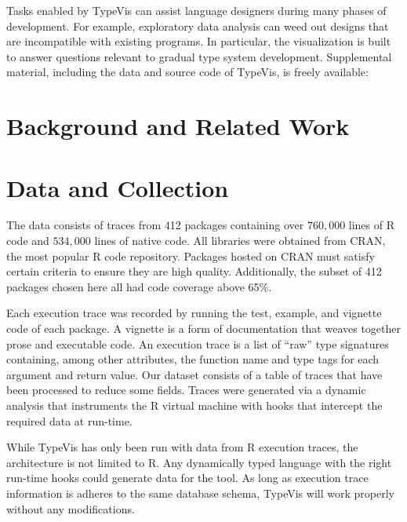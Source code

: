 \documentclass{vgtc}                          %
\begin{document}
Tasks enabled by {\sc TypeVis} can assist language designers
during many phases of development.
For example, exploratory data analysis can weed out designs that
are incompatible with existing programs.
In particular, the visualization is built to answer questions
relevant to gradual type system development.
Supplemental material, including the data and source code of
{\sc TypeVis}, is freely available: 


\section{Background and Related Work}






\section{Data and Collection}


The data consists of traces from 412 packages
containing over $760,000$ lines of R code
and $534,000$ lines of native code.
All libraries were obtained from CRAN,
the most popular R code repository.
Packages hosted on CRAN must satisfy certain criteria
to ensure they are high quality.
Additionally, the subset of 412 packages chosen here
all had code coverage above 65\%.

Each execution trace was recorded by running
the test, example, and vignette code of each package.
A vignette is a form of documentation that weaves
together prose and executable code.
An execution trace is a list of ``raw'' type signatures
containing, among other attributes, the function name
and type tags for each argument and return value.
Our dataset consists of a table of traces
that have been processed to reduce some fields.
Traces were generated via a dynamic analysis
that instruments the R virtual machine with hooks
that intercept the required data at run-time.

While {\sc TypeVis} has only been run with
data from R execution traces, the architecture is not
limited to R.
Any dynamically typed language with the right run-time
hooks could generate data for the tool.
As long as execution trace information is adheres to
the same database schema, {\sc TypeVis} will
work properly without any modifications.
\end{document}
